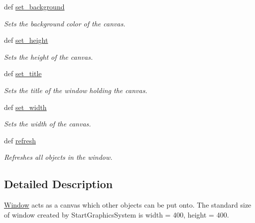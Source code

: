 \begin{DoxyCompactItemize}
def \hyperlink{classcs110graphics_1_1Window_a981a3115f1f22099549117313f38333c}{set\_\-background}
\begin{DoxyCompactList}\small\item\em Sets the background color of the canvas. \item\end{DoxyCompactList}\item 
def \hyperlink{classcs110graphics_1_1Window_a9b548549f8f09ca3f29e6e80483e21d2}{set\_\-height}
\begin{DoxyCompactList}\small\item\em Sets the height of the canvas. \item\end{DoxyCompactList}\item 
def \hyperlink{classcs110graphics_1_1Window_a227c806c2acbcaca9958ba3b610a85f6}{set\_\-title}
\begin{DoxyCompactList}\small\item\em Sets the title of the window holding the canvas. \item\end{DoxyCompactList}\item 
def \hyperlink{classcs110graphics_1_1Window_a55036373bfb4437eb4368a39fedb8722}{set\_\-width}
\begin{DoxyCompactList}\small\item\em Sets the width of the canvas. \item\end{DoxyCompactList}\item 
def \hyperlink{classcs110graphics_1_1Window_a683be16067bd2cfe72b14b421b7ba535}{refresh}
\begin{DoxyCompactList}\small\item\em Refreshes all objects in the window. \item\end{DoxyCompactList}\end{DoxyCompactItemize}


\subsection{Detailed Description}
\hyperlink{classcs110graphics_1_1Window}{Window} acts as a canvas which other objects can be put onto. The standard size of window created by StartGraphicsSystem is width = 400, height = 400. 

